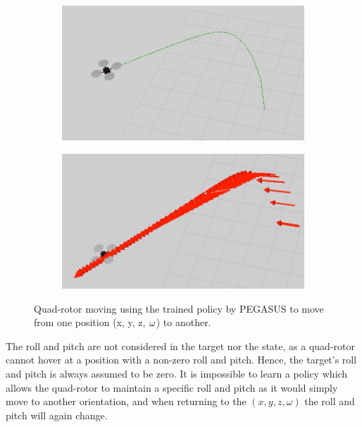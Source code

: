 \documentclass[hidelinks,BTech]{iitmdiss}
\begin{document}
\begin{figure}[H]
  \centering
    \begin{subfigure}[t]{0.45\textwidth}
      \centering
        \includegraphics[width=\textwidth]{quadrotor_position_control.png}
    \end{subfigure}
    \begin{subfigure}[t]{0.45\textwidth}
      \centering
        \includegraphics[width=\textwidth]{quadrotor_position_control2.png}
    \end{subfigure}
    \caption{Quad-rotor moving using the trained policy by PEGASUS to move from one position (x, y, z, $\protect\omega$) to another.}
\end{figure}

The roll and pitch are not considered in the target nor the state, as a quad-rotor cannot hover at a position with a non-zero roll and pitch. Hence, the target's roll and pitch is always assumed to be zero. It is impossible to learn a policy which allows the quad-rotor to maintain a specific roll and pitch as it would simply move to another orientation, and when returning to the $(x, y, z, \omega)$ the roll and pitch will again change.
\end{document}
